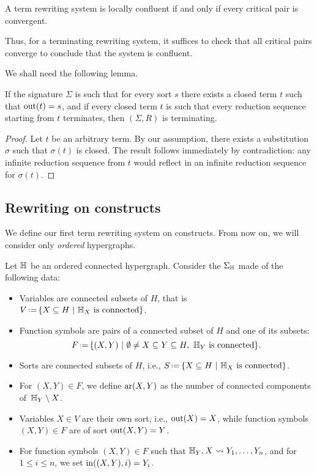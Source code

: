 \begin{lemma}
  \label{l:local-confluence-critical-pair}
  A term rewriting system is locally confluent if and only if every critical pair is convergent. 
\end{lemma}

Thus, for a terminating rewriting system, it suffices to check that all critical pairs converge to conclude that the system is confluent. 

\smallskip
We shall need the following lemma.

\begin{lemma} \label{closed-termination}
If the signature $\Sigma$ is such that for every sort $s$ there exists a closed term $t$ such that $\operatorname{out}(t)=s$, and if  every closed term $t$ is such that every reduction sequence starting from $t$ terminates, then $(\Sigma,R)$ is terminating.
\end{lemma}
\begin{proof} Let $t$ be an arbitrary term. By our assumption, there exists a substitution $\sigma$ such that $\sigma(t)$ is closed. The result follows immediately by contradiction: any infinite reduction sequence from 
$t$ would reflect in an infinite reduction sequence for $\sigma(t)$.
\end{proof}



\subsection{Rewriting on constructs}
\label{ss:rewriting-constructs}
We define our first term rewriting system on constructs. 
From now on, we will consider only \emph{ordered} hypergraphs.

\begin{definition} \label{def:signature-hyper}
  Let ${\mathbb H}$ be an ordered connected hypergraph. 
Consider the  $\Sigma_{\mathbb H}$ made of the following data: 
\begin{itemize}
  \item Variables are connected subsets of $H$, that is $V\eqdef \{ X \subseteq H \ | \ \hyper{H}_{X} \text{ is connected}\}$. 
  \item Function symbols are pairs of a connected subset of $H$ and one of its subsets:
  $$F\eqdef \{(X,Y) \ | \ \emptyset \neq X \subseteq Y \subseteq H, \ \hyper{H}_Y \text{ is connected}\}.$$
  \item Sorts are connected subsets of $H$, i.e., $S\eqdef \{ X \subseteq H \ | \ \hyper{H}_X \text{ is connected}\}$.
  \item For $(X,Y) \in F$, we define $\mathrm{ar}(X,Y)$ as the number of connected components of~${\mathbb H}_Y\setminus X$.
  \item Variables $X \in V$ are their own sort, i.e., $\operatorname{out}(X)=X$, while function symbols $(X,Y) \in F$ are of sort $\operatorname{out}(X,Y)=Y$.
  \item For function symbols $(X,Y) \in F$ such that ${\mathbb H}_Y,X \leadsto Y_1,\ldots,Y_n$, and for $1 \leq i \leq n$, we set $\operatorname{in}((X,Y),i)=Y_i$.
\end{itemize}
\end{definition}

